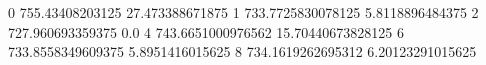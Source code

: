 0 755.43408203125 27.473388671875
1 733.7725830078125 5.8118896484375
2 727.960693359375 0.0
4 743.6651000976562 15.70440673828125
6 733.8558349609375 5.8951416015625
8 734.1619262695312 6.20123291015625

